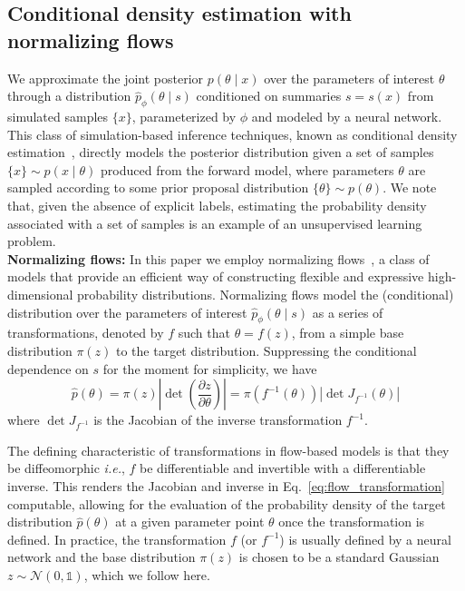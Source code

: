 \documentclass[prd,aps,10pt,nofootinbib,twocolumn,superscriptaddress,preprintnumbers,balancelastpage,longbibliography]{revtex4-1}
\begin{document}
\subsection{Conditional density estimation with normalizing flows}

We approximate the joint posterior $p(\theta\mid x)$ over the parameters of interest $\theta$ through a distribution $\hat p_\phi(\theta\mid s)$ conditioned on summaries $s=s(x)$ from simulated samples $\{x\}$, parameterized by $\phi$ and modeled by a neural network. This class of simulation-based inference techniques, known as conditional density estimation~\cite{papamakariosFastEpsilonFree2018}, directly models the posterior distribution given a set of samples $\{x\}\sim p(x\mid\theta)$ produced from the forward model, where parameters $\theta$ are sampled according to some prior proposal distribution $\{\theta\}\sim p(\theta)$. We note that, given the absence of explicit labels, estimating the probability density associated with a set of samples is an example of an unsupervised learning problem. \\

\noindent
\textbf{Normalizing flows:}
In this paper we employ normalizing flows~\cite{papamakarios2019normalizing,rezende2015variational}, a class of models that provide an efficient way of constructing flexible and expressive high-dimensional probability distributions. Normalizing flows model the (conditional) distribution over the parameters of interest $\hat p_\phi(\theta\mid s)$ as a series of transformations, denoted by $f$ such that $\theta = f(z)$, from a simple base distribution $\pi({z})$ to the target distribution. Suppressing the conditional dependence on $s$ for the moment for simplicity, we have
\begin{equation}
    \label{eq:flow_transformation}
\hat{p}({\theta})=\pi(z)\left|\operatorname{det}\left(\frac{\partial z}{\partial {\theta}}\right)\right|=\pi(f^{-1}({\theta}))\left|\operatorname{det}J_{f^{-1}}(\theta)\right|
\end{equation}
where $\operatorname{det}J_{f^{-1}}$ is the Jacobian of the inverse transformation $f^{-1}$.

The defining characteristic of transformations in flow-based models is that they be diffeomorphic \emph{i.e.}, $f$ be differentiable and invertible with a differentiable inverse. This renders the Jacobian and inverse in Eq.~\eqref{eq:flow_transformation} computable, allowing for the evaluation of the probability density of the target distribution $\hat{p}({\theta})$ at a given parameter point $\theta$ once the transformation is defined. In practice, the transformation $f$ (or $f^{-1}$) is usually defined by a neural network and the base distribution $\pi(z)$ is chosen to be a standard Gaussian $z\sim \mathcal N(0, \mathbb{1})$, which we follow here. 
\end{document}
